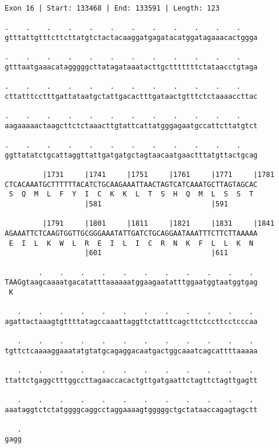 \documentclass{article}
\begin{document}
\begin{Verbatim}[fontfamily=courier]
Exon 16 | Start: 133468 | End: 133591 | Length: 123

.    .    .    .    .    .    .    .    .    .    .    .    
gtttattgtttcttcttatgtctactacaaggatgagatacatggatagaaacactggga

.    .    .    .    .    .    .    .    .    .    .    .    
gtttaatgaaacatagggggcttatagataaatacttgctttttttctataacctgtaga

.    .    .    .    .    .    .    .    .    .    .    .    
cttatttcctttgattataatgctattgacactttgataactgtttctctaaaaccttac

.    .    .    .    .    .    .    .    .    .    .    .    
aagaaaaactaagcttctctaaacttgtattcattatgggagaatgccattcttatgtct

.    .    .    .    .    .    .    .    .    .    .    .    
ggttatatctgcattaggttattgatgatgctagtaacaatgaactttatgttactgcag

         |1731     |1741     |1751     |1761     |1771     |1781
CTCACAAATGCTTTTTTACATCTGCAAGAAATTAACTAGTCATCAAATGCTTAGTAGCAC
 S  Q  M  L  F  Y  I  C  K  K  L  T  S  H  Q  M  L  S  S  T 
                   |581                          |591       

         |1791     |1801     |1811     |1821     |1831     |1841
AGAAATTCTCAAGTGGTTGCGGGAAATATTGATCTGCAGGAATAAATTTCTTCTTAAAAA
 E  I  L  K  W  L  R  E  I  L  I  C  R  N  K  F  L  L  K  N 
                   |601                          |611       

        .    .    .    .    .    .    .    .    .    .    . 
TAAGgtaagcaaaatgacatatttaaaaaatggaagaatatttggaatggtaatggtgag
 K                                                          

   .    .    .    .    .    .    .    .    .    .    .    . 
agattactaaagtgttttatagccaaattaggttctatttcagcttctccttcctcccaa

   .    .    .    .    .    .    .    .    .    .    .    . 
tgttctcaaaaggaaatatgtatgcagaggacaatgactggcaaatcagcattttaaaaa

   .    .    .    .    .    .    .    .    .    .    .    . 
ttattctgaggctttggccttagaaccacactgttgatgaattctagttctagttgagtt

   .    .    .    .    .    .    .    .    .    .    .    . 
aaataggtctctatggggcaggcctaggaaaagtgggggctgctataaccagagtagctt

   .
gagg
\end{Verbatim}
\newpage
\end{document}
